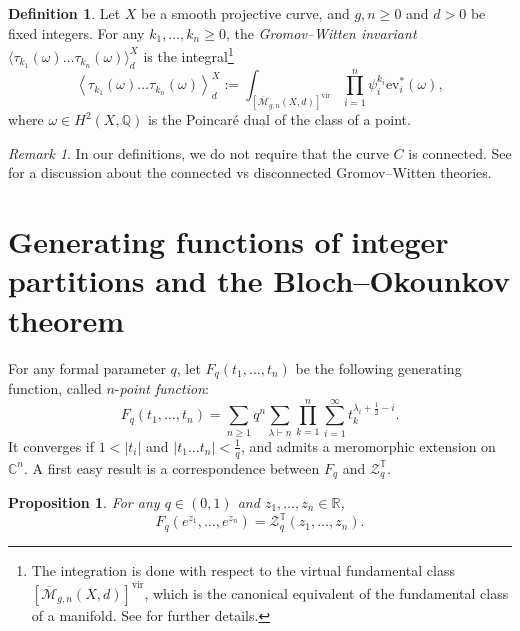 \documentclass[11pt,a4paper,reqno]{article}
\newtheorem{proposition}[theorem]{Proposition}
\theoremstyle{definition}
\newtheorem{definition}[theorem]{Definition}
\theoremstyle{remark}
\newtheorem{remark}[theorem]{Remark}
\newcommand\Q{{\mathbb Q}}
\newcommand\R{\mathbb{R}}
\newcommand\C{\mathbb{C}}
\newcommand\Tbb{\mathbb{T}}
\newcommand\ev{{\mathrm{ev}}}
\begin{document}
\begin{definition}
Let $X$ be a smooth projective curve, and $g,n\geq 0$ and $d>0$ be fixed integers. For any $k_1,\ldots,k_n\geq 0$, the \emph{Gromov--Witten invariant} $\langle\tau_{k_1}(\omega)\ldots\tau_{k_n}(\omega)\rangle_d^X$ is the integral\footnote{The integration is done with respect to the virtual fundamental class $[\overline{\mathcal{M}}_{g,n}(X,d)]^{\mathrm{vir}}$, which is the canonical equivalent of the fundamental class of a manifold. See \cite[\S 26.1]{HKKPRV} for further details.}
\begin{equation}\label{eq:stationary_GW}
\left\langle \tau_{k_1}(\omega)\ldots\tau_{k_n}(\omega)\right\rangle_d^X := \int_{\left[\overline{\mathcal{M}}_{g,n}(X,d)\right]^{\mathrm{vir}}}\prod_{i=1}^n \psi_i^{k_i}\ev_i^*(\omega),
\end{equation}
where $\omega\in H^2(X,\Q)$ is the Poincar\'e dual of the class of a point.
\end{definition}

\begin{remark}
In our definitions, we do not require that the curve $C$ is connected. See \cite{OP2} for a discussion about the connected vs disconnected Gromov--Witten theories.
\end{remark}

\section{Generating functions of integer partitions and the Bloch--Okounkov theorem}\label{sec:GF_appendix}

For any formal parameter $q$, let $F_q(t_1,\ldots,t_n)$ be the following generating function, called $n$-\emph{point function}:
\begin{equation}\label{eq:npoint}
F_q(t_1,\ldots,t_n)=\sum_{n\geq 1}q^n\sum_{\lambda\vdash n}\prod_{k=1}^n\sum_{i=1}^\infty t_k^{\lambda_i+\frac12-i}.
\end{equation}
It converges if $1<\vert t_i\vert$ and $\vert t_1\ldots t_n\vert<\frac1q$, and admits a meromorphic extension on $\C^n$. A first easy result is a correspondence between $F_q$ and $\mathcal{Z}_q^\Tbb$.

\begin{proposition}\label{prop:corresp_GF}
For any $q\in(0,1)$ and $z_1,\ldots,z_n\in\R$,
\begin{equation}
F_q(e^{z_1},\ldots,e^{z_n})=\mathcal{Z}_q^\Tbb(z_1,\ldots,z_n).
\end{equation}
\end{proposition}
\end{document}
